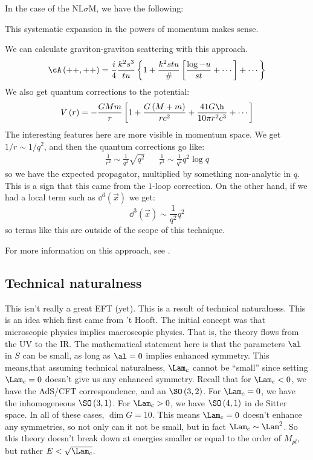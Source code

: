 \documentclass{booc}
\begin{document}
In the case of the NL$\sigma$M, we have the following:
\begin{thm}[Weinberg]
This systematic expansion in the powers of momentum makes sense.
\end{thm}

\begin{exm}
We can calculate graviton-graviton scattering with this approach. 
\begin{equation}
\cA\left( ++ , ++ \right) = 
\frac{i}{4}\frac{k^2 s^3}{tu}
\left\{ 
1 + \frac{k^2 stu}{\#} \left[ \frac{\log{-u}}{st} + \cdots \right] + \cdots \right\}
\end{equation}
We also get quantum corrections to the potential:
\begin{equation}
V\left( r \right) = -\frac{G M m }{r} \left[ 
1 + \frac{G\left( M + m \right)}{rc^2} + 
\frac{41 G\h}{10\pi r^2 c^3}+ \cdots\right]
\end{equation}
The interesting features here are more visible in momentum space. 
We get $1 / r\sim 1 / q^2$, and then the quantum corrections go like:
\begin{align}
\frac{1}{r^2} \sim \frac{1}{q^2} \sqrt{q^2}
&&
\frac{1}{r^3} \sim \frac{1}{q^2} q^2 \log q
\end{align}
so we have the expected propagator, multiplied by something non-analytic in $q$. 
This is a sign that this came from the $1$-loop correction.
On the other hand, if we had a local term such as $\dd^3\left( \vec{x} \right)$ we get:
\begin{equation}
\dd^3\left( \vec{x} \right)\sim \frac{1}{q^2} q^2
\end{equation}
so terms like this are outside of the scope of this technique.
\end{exm}

For more information on this approach, see
\cites{donoghue_1,donoghue_2}.

\subsection{Technical naturalness}

This isn't really a great EFT (yet). This is a result of technical naturalness. 
This is an idea which first came from 't Hooft. The initial concept was that microscopic 
physics implies macroscopic physics. That is, the theory flows from the UV to the IR. 
The mathematical statement here is that the parameters $\al$ in  $S$ can be small, as long as
$\al = 0$ implies enhanced symmetry.
This means,that assuming technical naturalness, $\Lam_c$ cannot be ``small'' since 
setting $\Lam_c=0$ doesn't give us any enhanced symmetry. 
Recall that for $\Lam_c < 0$, we have the AdS/CFT correspondence, and an $\SO\left( 3,2 \right)$. 
For $\Lam_c = 0$, we have the inhomogeneous $\SO\left( 3,1 \right)$. 
For $\Lam_c > 0$, we have $\SO\left( 4,1 \right)$ in de Sitter space. 
In all of these cases, $\dim G = 10$.
This means $\Lam_c = 0$ doesn't enhance any symmetries, so not only can it not be small, but in fact
$\Lam_c \sim \Lam^2$. 
So this theory doesn't break down at energies smaller or equal to the order of $M_{pl}$, but rather
$E < \sqrt{\Lam_c}$. 
\end{document}
